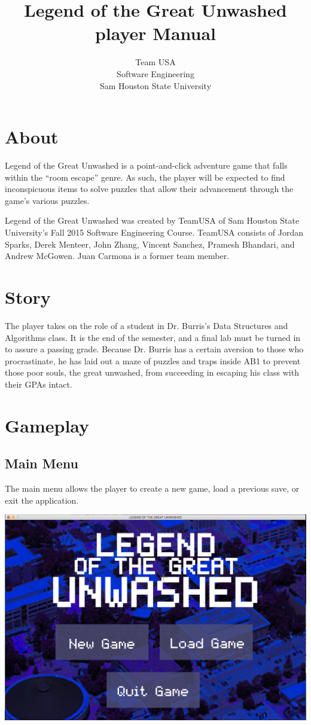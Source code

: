 \documentclass{article}
\title{Legend of the Great Unwashed \\ player Manual}
\author{Team USA \\ Software Engineering \\ Sam Houston State University}
\begin{document}
%
%
\maketitle
\newpage
%
%
\tableofcontents
\newpage
%
%
\section{About}
	Legend of the Great Unwashed is a point-and-click adventure game that falls within the ``room escape'' genre. As such, the player will be expected to find inconspicuous items to solve puzzles that allow their advancement through the game's various puzzles. 
	
	Legend of the Great Unwashed was created by TeamUSA of Sam Houston State University's Fall 2015 Software Engineering Course. TeamUSA consists of Jordan Sparks, Derek Menteer, John Zhang, Vincent Sanchez, Pramesh Bhandari, and Andrew McGowen. Juan Carmona is a former team member. 
\section{Story}
	The player takes on the role of a student in Dr. Burris's Data Structures and Algorithms class. It is the end of the semester, and a final lab must be turned in to assure a passing grade. Because Dr. Burris has a certain aversion to those who procrastinate, he has laid out a maze of puzzles and traps inside AB1 to prevent those poor souls, the great unwashed, from succeeding in escaping his class with their GPAs intact. 
\section{Gameplay}
	\subsection{Main Menu}
		The main menu allows the player to create a new game, load a previous save, or exit the application.
		\begin{center}
			\includegraphics[scale=0.3]{UMimages/mainMenu}
		\end{center} 
\end{document}
